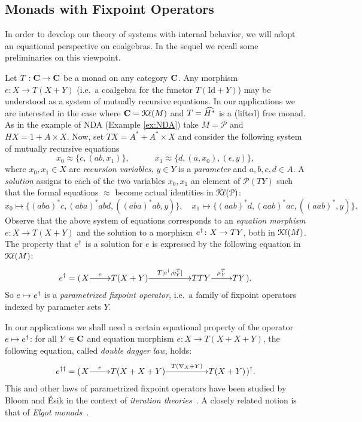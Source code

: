 \documentclass[oribibl,envcountsame,envcountsect,runningheads]{llncs}
\newcommand{\Pow}{\mathcal{P}}
\newcommand{\Kl}{\mathcal{K}{\kern-.2ex}\ell}
\newcommand{\lift}[1]{\smash{\widehat{#1}}}
\newcommand{\free}[1]{{#1^*}}
\renewcommand{\>}{\rangle}
\def\Id{\mathrm{Id}}
\def\eps{\epsilon}
\begin{document}
\subsection{Monads with Fixpoint Operators}\label{Sec:Elgot}

In order to develop our theory of systems with internal behavior, we will adopt an equational perspective on coalgebras. In the sequel we recall some preliminaries on this viewpoint.

Let $T: \mathbf{C} \to \mathbf{C}$ be a monad on any category $\mathbf{C}$. Any morphism $e: X \to T(X+Y)$ (i.e.~a coalgebra for the functor
$T(\Id+Y)$) may be understood as a system of mutually recursive equations. In our
applications we are interested in the case where $\C = \Kl(M)$ and
 $T = \lift{\free{H}}$ is a (lifted) free monad. As in the example of NDA (Example \ref{ex:NDA}) take $M =
\Pow$ and $HX = 1 + A \times X$. Now, set $TX = A^{*}
+ A^{*} \times X$ and consider the following system of mutually
recursive equations
\[
  x_0  \approx  \{ c, (ab, x_1) \}, \qquad \quad x_1  \approx  \{ d, (a, x_0), (\eps, y) \},
\]
where $x_0, x_1 \in X$ are \emph{recursion variables}, $y \in Y$ is a \emph{parameter} and $a, b, c, d \in A$. A \emph{solution} assigns to each
of the two variables $x_0, x_1$ an element of $\Pow(TY)$ such that
the formal equations $\approx$ become actual identities in $\Kl(\Pow)$:
\[
x_0 \mapsto \{ (aba)^*c, (aba)^*abd, ((aba)^*ab, y)\},
\quad
x_1 \mapsto \{ (aab)^*d, (aab)^*ac, ((aab)^*, y)\}.
\]
Observe that the above system of equations corresponds to an \emph{equation morphism} $e \colon X \to T(X+Y)$ and the solution to a morphism ${e}^\dag \colon X \to TY$, both in $\Kl(M)$. The property that ${e}^\dag$ is a solution for $e$ is expressed by the following equation in $\Kl(M)$:
\begin{equation}
\label{diag:fixp}
\gensol e = (\xymatrix@1{
  X \ar[r]^-e
  &
  T(X+Y) \ar[rr]^-{T[\gensol e, \eta^T_Y]}
  &&
  TTY
  \ar[r]^-{\mu^T_Y}
  &
  TY
  }).
\end{equation}
So $e \mapsto {e}^\dag$ is a \emph{parametrized fixpoint operator}, i.e.~a family of fixpoint operators indexed by parameter sets $Y$.
\begin{remark} \label{rmk:doubledagger} In our
applications we shall need a certain equational property of the operator $e \mapsto {e}^\dag$: for all $Y \in \mathbf{C}$ and equation morphism $e: X \to T(X+X+Y)$,
the following equation, called \emph{double dagger law}, holds:
\[
e^{\dagger\dagger} = (\xymatrix@1{
  X \ar[r]^-e & T(X+X+Y) \ar[rr]^-{T(\nabla_X + Y)} && T(X+Y)
})^\dagger.
\]
This and other laws of parametrized fixpoint operators have been
studied by Bloom and \'Esik in the context of \emph{iteration
  theories}~\cite{be93}. A closely related notion is that of \emph{Elgot monads}~\cite{amv10,amv11}.
\end{remark}
\end{document}
